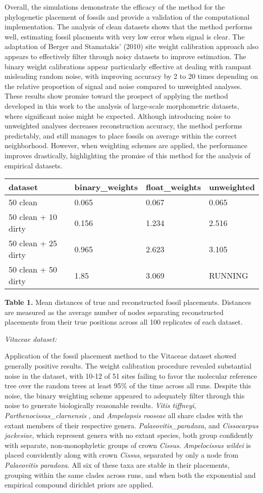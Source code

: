 \documentclass[12pt]{article}
\begin{document}
Overall, the simulations demonstrate the efficacy of the method for the
phylogenetic placement of fossils and provide a validation of the
computational implementation. The analysis of clean datasets shows that
the method performs well, estimating fossil placments with very low
error when signal is clear. The adaptation of Berger and Stamatakis'
(2010) site weight calibration approach also appears to effectively
filter through noisy datasets to improve estimation. The binary weight
calibrations appear particularly effective at dealing with rampant
misleading random noise, with improving accuracy by 2 to 20 times
depending on the relative proportion of signal and noise compared to
unweighted analyses. These results show promise toward the prospect of
applying the method developed in this work to the analysis of
large-scale morphometric datasets, where significant noise might be
expected. Although introducing noise to unweighted analyses decreases
reconstruction accuracy, the method performs predictably, and still
manages to place fossils on average within the correct neighborhood.
However, when weighting schemes are applied, the performance improves
drastically, highlighting the promise of this method for the analysis of
empirical datasets.

\begin{longtable}[]{@{}llll@{}}
\toprule
dataset & binary\_weights & float\_weights & unweighted\tabularnewline
\midrule
\endhead
50 clean & 0.065 & 0.067 & 0.065\tabularnewline
50 clean + 10 dirty & 0.156 & 1.234 & 2.516\tabularnewline
50 clean + 25 dirty & 0.965 & 2.623 & 3.105\tabularnewline
50 clean + 50 dirty & 1.85 & 3.069 & RUNNING\tabularnewline
\bottomrule
\end{longtable}

\textbf{Table 1.} Mean distances of true and reconstructed fossil
placements. Distances are measured as the average number of nodes
separating reconstructed placements from their true positions across all
100 replicates of each dataset.

\emph{Vitaceae dataset:}

Application of the fossil placement method to the Vitaceae dataset
showed generally positive results. The weight calibration procedure
revealed substantial noise in the dataset, with 10-12 of 51 sites
failing to favor the molecular reference tree over the random trees at
least 95\% of the time across all runs. Despite this noise, the binary
weighting scheme appeared to adequately filter through this noise to
generate biologically reasonable results. \emph{Vitis tiffneyi},
\emph{Parthenocissus\_clarnensis} , and \emph{Ampelopsis rooseae} all
share clades with the extant members of their respective genera.
\emph{Palaeovitis\_paradoxa}, and \emph{Cissocarpus jackesiae}, which
represent genera with no extant species, both group confidently with
separate, non-monophyletic groups of crown \emph{Cissus}.
\emph{Ampelocissus wildei} is placed convidently along with crown
\emph{Cissus}, separated by only a node from \emph{Palaeovitis
paradoxa}. All six of these taxa are stable in their placements,
grouping within the same clades across runs, and when both the
exponential and empirical compound dirichlet priors are applied.
\end{document}
